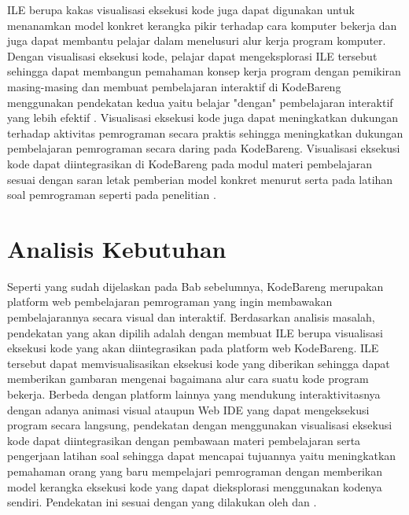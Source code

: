 ILE berupa kakas visualisasi eksekusi kode juga dapat digunakan untuk menanamkan model konkret kerangka pikir terhadap cara komputer bekerja \parencite{mayer1981psychology} dan juga dapat membantu pelajar dalam menelusuri alur kerja program komputer. Dengan visualisasi eksekusi kode, pelajar dapat mengeksplorasi ILE tersebut sehingga dapat membangun pemahaman konsep kerja program dengan pemikiran masing-masing dan membuat pembelajaran interaktif di KodeBareng menggunakan pendekatan kedua yaitu belajar "dengan" pembelajaran interaktif yang lebih efektif \parencite{reeves2012interactive}. Visualisasi eksekusi kode juga dapat meningkatkan dukungan terhadap aktivitas pemrograman secara praktis \parencite{choy2004interactive} sehingga meningkatkan dukungan pembelajaran pemrograman secara daring pada KodeBareng. Visualisasi eksekusi kode dapat diintegrasikan di KodeBareng pada modul materi pembelajaran sesuai dengan saran letak pemberian model konkret menurut \textcite{mayer1981psychology} serta pada latihan soal pemrograman seperti pada penelitian \textcite{moons2013pilot}.

\section{Analisis Kebutuhan} \label{sec:analisis-kebutuhan}
Seperti yang sudah dijelaskan pada Bab sebelumnya, KodeBareng merupakan platform web pembelajaran pemrograman yang ingin membawakan pembelajarannya secara visual dan interaktif. Berdasarkan analisis masalah, pendekatan yang akan dipilih adalah dengan membuat ILE berupa visualisasi eksekusi kode yang akan diintegrasikan pada platform web KodeBareng. ILE tersebut dapat memvisualisasikan eksekusi kode yang diberikan sehingga dapat memberikan gambaran mengenai bagaimana alur cara suatu kode program bekerja. Berbeda dengan platform lainnya yang mendukung interaktivitasnya dengan adanya animasi visual ataupun Web IDE yang dapat mengeksekusi program secara langsung, pendekatan dengan menggunakan visualisasi eksekusi kode dapat diintegrasikan dengan pembawaan materi pembelajaran serta pengerjaan latihan soal sehingga dapat mencapai tujuannya yaitu meningkatkan pemahaman orang yang baru mempelajari pemrograman dengan memberikan model kerangka eksekusi kode yang dapat dieksplorasi menggunakan kodenya sendiri. Pendekatan ini sesuai dengan yang dilakukan oleh \textcite{moons2013pilot} dan \textcite{mayer1981psychology}.


